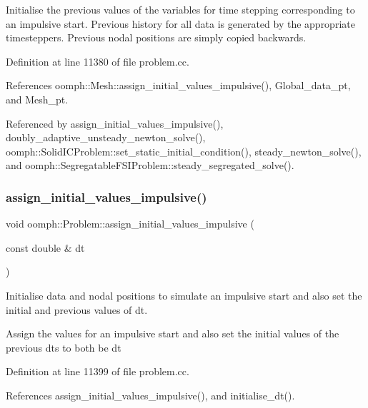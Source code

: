 Initialise the previous values of the variables for time stepping corresponding to an impulsive start. Previous history for all data is generated by the appropriate timesteppers. Previous nodal positions are simply copied backwards. 

Definition at line 11380 of file problem.\+cc.



References oomph\+::\+Mesh\+::assign\+\_\+initial\+\_\+values\+\_\+impulsive(), Global\+\_\+data\+\_\+pt, and Mesh\+\_\+pt.



Referenced by assign\+\_\+initial\+\_\+values\+\_\+impulsive(), doubly\+\_\+adaptive\+\_\+unsteady\+\_\+newton\+\_\+solve(), oomph\+::\+Solid\+I\+C\+Problem\+::set\+\_\+static\+\_\+initial\+\_\+condition(), steady\+\_\+newton\+\_\+solve(), and oomph\+::\+Segregatable\+F\+S\+I\+Problem\+::steady\+\_\+segregated\+\_\+solve().

\mbox{\label{classoomph_1_1Problem_a296bd0ba13bd51a96bb7057845e5a800}} 
\subsubsection{\texorpdfstring{assign\+\_\+initial\+\_\+values\+\_\+impulsive()}{assign\_initial\_values\_impulsive()}\hspace{0.1cm}{\footnotesize\ttfamily [2/2]}}
{\footnotesize\ttfamily void oomph\+::\+Problem\+::assign\+\_\+initial\+\_\+values\+\_\+impulsive (\begin{DoxyParamCaption}\item[{const double \&}]{dt }\end{DoxyParamCaption})}



Initialise data and nodal positions to simulate an impulsive start and also set the initial and previous values of dt. 

Assign the values for an impulsive start and also set the initial values of the previous dts to both be dt 

Definition at line 11399 of file problem.\+cc.



References assign\+\_\+initial\+\_\+values\+\_\+impulsive(), and initialise\+\_\+dt().

